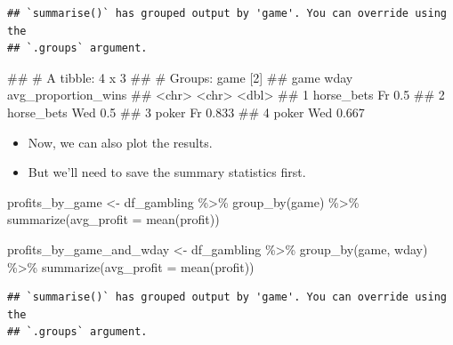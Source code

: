 \documentclass[
]{book}
\newenvironment{Shaded}{\begin{snugshade}}{\end{snugshade}}
\newcommand{\AttributeTok}[1]{\textcolor[rgb]{0.77,0.63,0.00}{#1}}
\newcommand{\FunctionTok}[1]{\textcolor[rgb]{0.00,0.00,0.00}{#1}}
\newcommand{\NormalTok}[1]{#1}
\newcommand{\OtherTok}[1]{\textcolor[rgb]{0.56,0.35,0.01}{#1}}
\newcommand{\SpecialCharTok}[1]{\textcolor[rgb]{0.00,0.00,0.00}{#1}}
\providecommand{\tightlist}{%
  \setlength{\itemsep}{0pt}\setlength{\parskip}{0pt}}
\begin{document}
\begin{verbatim}
## `summarise()` has grouped output by 'game'. You can override using the
## `.groups` argument.
\end{verbatim}

\begin{Shaded}
\begin{Highlighting}[]
\NormalTok{\#\# \# A tibble: 4 x 3}
\NormalTok{\#\# \# Groups:   game [2]}
\NormalTok{\#\#   game       wday  avg\_proportion\_wins}
\NormalTok{\#\#   \textless{}chr\textgreater{}      \textless{}chr\textgreater{}               \textless{}dbl\textgreater{}}
\NormalTok{\#\# 1 horse\_bets Fr                  0.5  }
\NormalTok{\#\# 2 horse\_bets Wed                 0.5  }
\NormalTok{\#\# 3 poker      Fr                  0.833}
\NormalTok{\#\# 4 poker      Wed                 0.667}
\end{Highlighting}
\end{Shaded}

\begin{itemize}
\tightlist
\item
  Now, we can also plot the results.
\item
  But we'll need to save the summary statistics first.
\end{itemize}

\begin{Shaded}
\begin{Highlighting}[]
\NormalTok{profits\_by\_game }\OtherTok{\textless{}{-}} 
\NormalTok{  df\_gambling }\SpecialCharTok{\%\textgreater{}\%} 
    \FunctionTok{group\_by}\NormalTok{(game) }\SpecialCharTok{\%\textgreater{}\%} 
    \FunctionTok{summarize}\NormalTok{(}\AttributeTok{avg\_profit =} \FunctionTok{mean}\NormalTok{(profit))}
\end{Highlighting}
\end{Shaded}

\begin{Shaded}
\begin{Highlighting}[]
\NormalTok{profits\_by\_game\_and\_wday }\OtherTok{\textless{}{-}} 
\NormalTok{  df\_gambling }\SpecialCharTok{\%\textgreater{}\%} 
    \FunctionTok{group\_by}\NormalTok{(game, wday) }\SpecialCharTok{\%\textgreater{}\%} 
    \FunctionTok{summarize}\NormalTok{(}\AttributeTok{avg\_profit =} \FunctionTok{mean}\NormalTok{(profit))}
\end{Highlighting}
\end{Shaded}

\begin{verbatim}
## `summarise()` has grouped output by 'game'. You can override using the
## `.groups` argument.
\end{verbatim}
\end{document}
